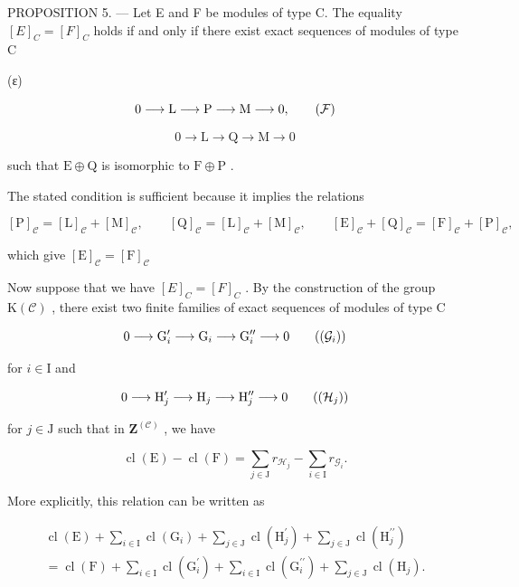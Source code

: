 PROPOSITION 5. --- Let E and F be modules of type C. The equality \([E]_{C} = [F]_{C}\) holds if and only if there exist exact sequences of modules of type C

(ε)

\[
0 \longrightarrow \mathrm{L} \longrightarrow \mathrm{P} \longrightarrow \mathrm{M} \longrightarrow 0,\tag{\( \mathcal{F} \)}
\]

\[
0 \longrightarrow \mathrm{L} \longrightarrow \mathrm{Q} \longrightarrow \mathrm{M} \longrightarrow 0
\]

such that \(\mathrm{E} \oplus \mathrm{Q}\) is isomorphic to \(\mathrm{F} \oplus \mathrm{P}\) .

The stated condition is sufficient because it implies the relations

\[
[ \mathrm{P} ] _ {\mathcal {C}} = [ \mathrm{L} ] _ {\mathcal {C}} + [ \mathrm{M} ] _ {\mathcal {C}}, \qquad [ \mathrm{Q} ] _ {\mathcal {C}} = [ \mathrm{L} ] _ {\mathcal {C}} + [ \mathrm{M} ] _ {\mathcal {C}}, \qquad [ \mathrm{E} ] _ {\mathcal {C}} + [ \mathrm{Q} ] _ {\mathcal {C}} = [ \mathrm{F} ] _ {\mathcal {C}} + [ \mathrm{P} ] _ {\mathcal {C}},
\]

which give \([\mathrm{E}]_{\mathcal{C}} = [\mathrm{F}]_{\mathcal{C}}\)

Now suppose that we have \([E]_{C} = [F]_{C}\) . By the construction of the group \(\mathrm{K}(\mathcal{C})\) , there exist two finite families of exact sequences of modules of type C

\[
0 \longrightarrow \mathrm{G} _ {i} ^ {\prime} \longrightarrow \mathrm{G} _ {i} \longrightarrow \mathrm{G} _ {i} ^ {\prime \prime} \longrightarrow 0\tag{\((\mathcal{G}_i)\)}
\]

for \(i\in \mathrm{I}\) and

\[
0 \longrightarrow \mathrm{H} _ {j} ^ {\prime} \longrightarrow \mathrm{H} _ {j} \longrightarrow \mathrm{H} _ {j} ^ {\prime \prime} \longrightarrow 0\tag{\((\mathcal{H}_j)\)}
\]

for \(j\in \mathrm{J}\) such that in \(\mathbf{Z}^{(\mathcal{C})}\) , we have

\[
\operatorname{cl} (\mathrm{E}) - \operatorname{cl} (\mathrm{F}) = \sum_ {j \in \mathrm{J}} r _ {\mathcal {H} _ {j}} - \sum_ {i \in \mathrm{I}} r _ {\mathcal {G} _ {i}}.
\]

More explicitly, this relation can be written as

\[
\begin{array}{c} \operatorname{cl} (\mathrm{E}) + \sum_ {i \in \mathrm{I}} \operatorname{cl} (\mathrm{G} _ {i}) + \sum_ {j \in \mathrm{J}} \operatorname{cl} (\mathrm{H} _ {j} ^ {\prime}) + \sum_ {j \in \mathrm{J}} \operatorname{cl} (\mathrm{H} _ {j} ^ {\prime \prime}) \\ = \operatorname{cl} (\mathrm{F}) + \sum_ {i \in \mathrm{I}} \operatorname{cl} (\mathrm{G} _ {i} ^ {\prime}) + \sum_ {i \in \mathrm{I}} \operatorname{cl} (\mathrm{G} _ {i} ^ {\prime \prime}) + \sum_ {j \in \mathrm{J}} \operatorname{cl} (\mathrm{H} _ {j}). \end{array}\tag{7}
\]

